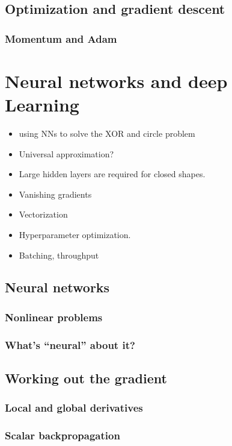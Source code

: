 \documentclass{pca}
\theoremstyle{theorem}
\theoremstyle{definition}
\theoremstyle{proof}
\begin{document}
\section{Optimization and gradient descent}
\subsection{Momentum and Adam}

\chapter{Neural networks and deep Learning}

\begin{itemize}
    \item using NNs to solve the XOR and circle problem
    \item Universal approximation?
    \item Large hidden layers are required for closed shapes.
    \item Vanishing gradients
	\item Vectorization
	\item Hyperparameter optimization.
	\item Batching, throughput
\end{itemize}

\section{Neural networks}

\subsection{Nonlinear problems}

\subsection{What's ``neural'' about it? }

\section{Working out the gradient}

\subsection{Local and global derivatives}

\subsection{Scalar backpropagation}
\end{document}
